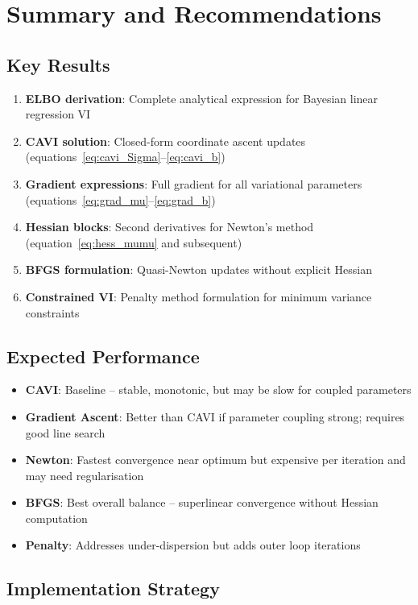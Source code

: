 \documentclass[11pt]{article}
\begin{document}
\section{Summary and Recommendations}

\subsection{Key Results}

\begin{enumerate}
\item \textbf{ELBO derivation}: Complete analytical expression for Bayesian linear regression VI
\item \textbf{CAVI solution}: Closed-form coordinate ascent updates (equations~\ref{eq:cavi_Sigma}--\ref{eq:cavi_b})
\item \textbf{Gradient expressions}: Full gradient for all variational parameters (equations~\ref{eq:grad_mu}--\ref{eq:grad_b})
\item \textbf{Hessian blocks}: Second derivatives for Newton's method (equation~\ref{eq:hess_mumu} and subsequent)
\item \textbf{BFGS formulation}: Quasi-Newton updates without explicit Hessian
\item \textbf{Constrained VI}: Penalty method formulation for minimum variance constraints
\end{enumerate}

\subsection{Expected Performance}

\begin{itemize}
\item \textbf{CAVI}: Baseline -- stable, monotonic, but may be slow for coupled parameters
\item \textbf{Gradient Ascent}: Better than CAVI if parameter coupling strong; requires good line search
\item \textbf{Newton}: Fastest convergence near optimum but expensive per iteration and may need regularisation
\item \textbf{BFGS}: Best overall balance -- superlinear convergence without Hessian computation
\item \textbf{Penalty}: Addresses under-dispersion but adds outer loop iterations
\end{itemize}

\subsection{Implementation Strategy}
\end{document}
